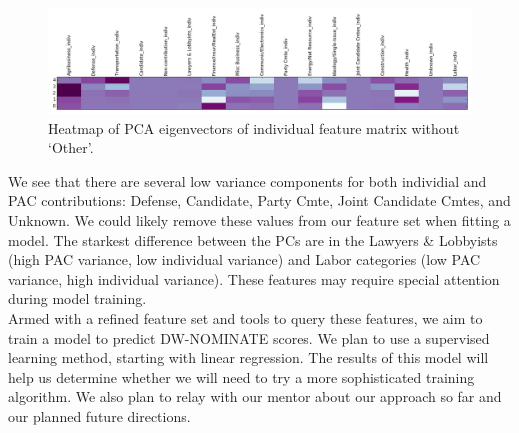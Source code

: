 \documentclass[10]{article}
\begin{document}
\begin{figure}[H]
\centering
\includegraphics[width=.9\textwidth]{../../data/features/visualize/pcs_no_other_indiv.png}
\caption{\label{fig:pc_indiv}Heatmap of PCA eigenvectors of individual feature matrix without `Other'.}
\end{figure}
We see that there are several low variance components for both individial and PAC contributions: Defense, Candidate, Party Cmte, Joint Candidate Cmtes, and Unknown.  We could likely remove these values from our feature set when fitting a model.  The starkest difference between the PCs are in the Lawyers \& Lobbyists (high PAC variance, low individual variance) and Labor categories (low PAC variance, high individual variance).  These features may require special attention during model training. \\

Armed with a refined feature set and tools to query these features, we aim to train a model to predict DW-NOMINATE scores.  We plan to use a supervised learning method, starting with linear regression.  The results of this model will help us determine whether we will need to try a more sophisticated training algorithm.  We also plan to relay with our mentor about our approach so far and our planned future directions. 

\printbibliography
\end{document}
